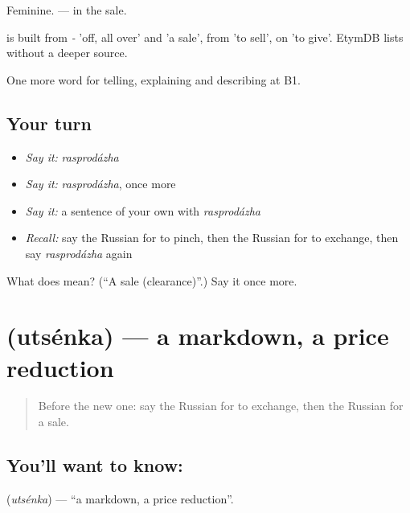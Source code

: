 Feminine. \emph{ } — in the sale.

\begin{cousinweb}
\emph{} is built from \emph{-} 'off, all over' and \emph{} 'a sale', from \emph{} 'to sell', on \emph{} 'to give'. EtymDB lists \emph{} without a deeper source.
\end{cousinweb}

\begin{grammarlens}[title={What you've built}]
One more word for telling, explaining and describing at B1.
\end{grammarlens}

\subsection*{Your turn}
\begin{itemize}
\raggedright
  \item \emph{Say it:} \emph{rasprodázha}
  \item \emph{Say it:} \emph{rasprodázha}, once more
  \item \emph{Say it:} a sentence of your own with \emph{rasprodázha}
  \item \emph{Recall:} say the Russian for to pinch, then the Russian for to exchange, then say \emph{rasprodázha} again
\end{itemize}

\begin{tcolorbox}[breakable,colback=teal!4,colframe=teal!35!black,title={Before you move on}]
What does  mean? (\textquotedblleft{}A sale (clearance)\textquotedblright{}.) Say it once more.
\end{tcolorbox}
\section[\texorpdfstring{\ru{уценка} (utsénka)}{уценка (utsénka)}]{ (utsénka) — a markdown, a price reduction}

\label{lesson:RU-C454-utsenka}



\begin{quote}
Before the new one: say the Russian for to exchange, then the Russian for a sale.
\end{quote}

\subsection*{You'll want to know: }
\textbf{} (\emph{utsénka}) — \textquotedblleft{}a markdown, a price reduction\textquotedblright{}.

